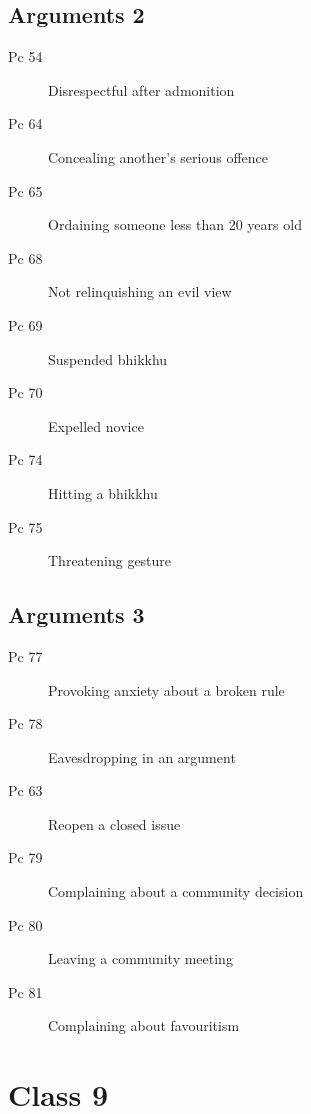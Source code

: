 \documentclass[11pt,oneside]{memoir}
\begin{document}
\begin{multicols}{2}

\section{Arguments 2}

\begin{description}
\item[Pc 54] Disrespectful after admonition
\item[Pc 64] Concealing another's serious offence
\item[Pc 65 \orig] Ordaining someone less than 20 years old%
\item[Pc 68] Not relinquishing an evil view
\item[Pc 69] Suspended bhikkhu
\item[Pc 70] Expelled novice
\item[Pc 74] Hitting a bhikkhu
\item[Pc 75] Threatening gesture
\end{description}

\columnbreak

\section{Arguments 3}

\begin{description}
\item[Pc 77] Provoking anxiety about a broken rule
\item[Pc 78 \orig] Eavesdropping in an argument%
\item[Pc 63] Reopen a closed issue
\item[Pc 79 \orig] Complaining about a community decision%
\item[Pc 80 \orig] Leaving a community meeting%
\item[Pc 81] Complaining about favouritism
\end{description}

\end{multicols}

\chapter{Class 9}
\end{document}
